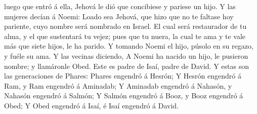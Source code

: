 luego que entró á ella, Jehová le dió que concibiese y pariese un hijo.
 Y las mujeres decían á Noemi: Loado sea Jehová, que hizo
que no te faltase hoy pariente, cuyo nombre será nombrado en Israel.
 El cual será restaurador de tu alma, y el que sustentará
tu vejez; pues que tu nuera, la cual te ama y te vale más que siete
hijos, le ha parido.  Y tomando Noemi el hijo, púsolo en
su regazo, y fuéle su ama.  Y las vecinas diciendo, A
Noemi ha nacido un hijo, le pusieron nombre; y llamáronle Obed. Este es
padre de Isaí, padre de David.  Y estas son las
generaciones de Phares: Phares engendró á Hesrón;  Y
Hesrón engendró á Ram, y Ram engendró á Aminadab;  Y
Aminadab engendró á Nahasón, y Nahasón engendró á Salmón;
 Y Salmón engendró á Booz, y Booz engendró á Obed;
 Y Obed engendró á Isaí, é Isaí engendró á David.
